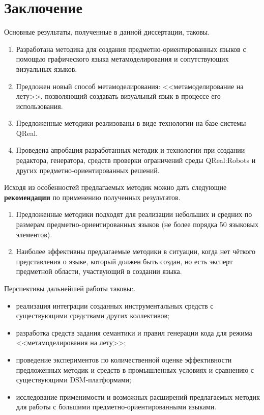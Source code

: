 \chapter*{Заключение}
Основные результаты, полученные в данной диссертации, таковы.
\begin{enumerate}
	\item Разработана методика для создания предметно-ориентированных языков с помощью 
		графического языка метамоделирования и сопутствующих визуальных языков.
	\item Предложен новый способ метамоделирования: <<метамоделирование на лету>>, позволяющий
		создавать визуальный язык в процессе его использования.
	\item Предложенные методики реализованы в виде технологии на базе системы QReal.
	\item Проведена апробация разработанных методик и технологии при создании редактора, 
		генератора, средств проверки ограничений среды QReal:Robots и других предметно-ориентированных 
		решений.
\end{enumerate}

Исходя из особенностей предлагаемых методик можно дать следующие \textbf{рекомендации} 
по применению полученных результатов.
\begin{enumerate}
	\item Предложенные методики подходят для реализации небольших и средних по размерам 
		предметно-ориентированных языков (не более порядка 50 языковых элементов).
	\item Наиболее эффективны предлагаемые методики в ситуации, когда нет чёткого представления
		о языке, который должен быть создан, но есть эксперт предметной области, участвующий
		в создании языка.
\end{enumerate}

Перспективы дальнейшей работы таковы:.
\begin{itemize}
	\item реализация интеграции созданных инструментальных средств с существующими 
		средствами других коллективов;
	\item разработка средств задания семантики и правил генерации кода для режима 
		<<метамоделирования на лету>>;
	\item проведение экспериментов по количественной оценке эффективности предложенных 
		методик и средств в промышленных условиях и сравнению с существующими DSM-платформами;
	\item исследование применимости и возможных расширений предлагаемых методик для работы
		с большими предметно-ориентированными языками.
\end{itemize}
